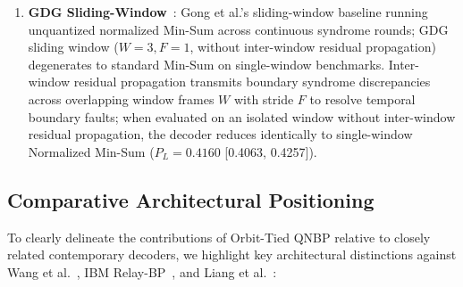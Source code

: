 \documentclass[journal]{IEEEtran}
\begin{document}
\begin{enumerate}
    \item \textbf{GDG Sliding-Window}~\cite{gong2024sliding}: Gong et al.'s sliding-window baseline running unquantized normalized Min-Sum across continuous syndrome rounds; GDG sliding window ($W=3, F=1$, without inter-window residual propagation) degenerates to standard Min-Sum on single-window benchmarks. Inter-window residual propagation transmits boundary syndrome discrepancies across overlapping window frames $W$ with stride $F$ to resolve temporal boundary faults; when evaluated on an isolated window without inter-window residual propagation, the decoder reduces identically to single-window Normalized Min-Sum ($P_L = 0.4160$ [0.4063, 0.4257]).
\end{enumerate}

\subsection{Comparative Architectural Positioning}
To clearly delineate the contributions of Orbit-Tied QNBP relative to closely related contemporary decoders, we highlight key architectural distinctions against Wang et al.~\cite{wang2022approximately}, IBM Relay-BP~\cite{muller2025relay}, and Liang et al.~\cite{liang2025planar}:
\end{document}
